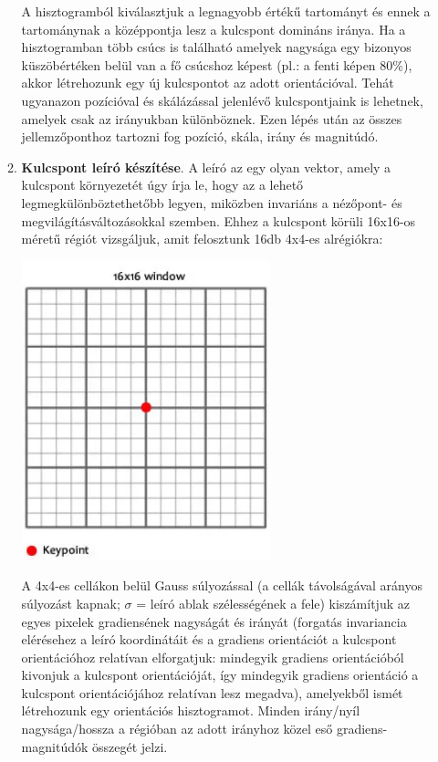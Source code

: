 \documentclass[12pt]{report}
\begin{document}
\begin{enumerate}
\begin{enumerate}
\begin{center}
                                    \end{center}
                                    A hisztogramból kiválasztjuk a legnagyobb értékű tartományt és ennek a tartománynak a középpontja lesz a kulcspont domináns iránya. Ha a hisztogramban több csúcs is található amelyek nagysága egy bizonyos küszöbértéken belül van a fő csúcshoz képest (pl.: a fenti képen 80\%), akkor létrehozunk egy új kulcspontot az adott orientációval. Tehát ugyanazon pozícióval és skálázással jelenlévő kulcspontjaink is lehetnek, amelyek csak az irányukban különböznek. Ezen lépés után az összes jellemzőponthoz tartozni fog pozíció, skála, irány és magnitúdó.
                                \item \textbf{Kulcspont leíró készítése}. A leíró az egy olyan vektor, amely a kulcspont környezetét úgy írja le, hogy az a lehető legmegkülönböztethetőbb legyen, miközben invariáns a nézőpont- és megvilágításváltozásokkal szemben. Ehhez a kulcspont körüli 16x16-os méretű régiót vizsgáljuk, amit felosztunk 16db 4x4-es alrégiókra:\\
                                    \begin{center}
                                        \includegraphics[scale=0.6]{descriptor_region.png}
                                    \end{center}
                                    A 4x4-es cellákon belül Gauss súlyozással (a cellák távolságával arányos súlyozást kapnak; $\sigma$ = leíró ablak szélességének a fele) kiszámítjuk az egyes pixelek gradiensének nagyságát és irányát (forgatás invariancia elérésehez a leíró koordinátáit és a gradiens orientációt a kulcspont orientációhoz relatívan elforgatjuk: mindegyik gradiens orientációból kivonjuk a kulcspont orientációját, így mindegyik gradiens orientáció a kulcspont orientációjához relatívan lesz megadva), amelyekből ismét létrehozunk egy orientációs hisztogramot. Minden irány/nyíl nagysága/hossza a régióban az adott irányhoz közel eső gradiens-magnitúdók összegét jelzi. \\

\end{enumerate}
\end{enumerate}
\end{document}

